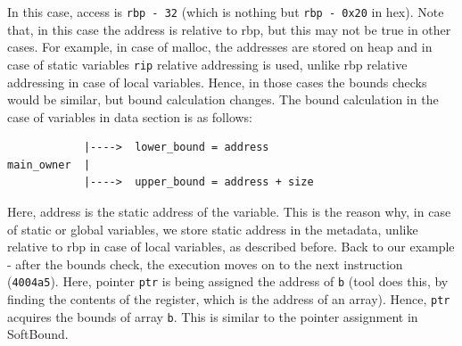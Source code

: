 In this case, access is \texttt{rbp - 32} (which is nothing but \texttt{rbp - 0x20} in hex). Note that, in this case the address is relative to rbp, but this may not be true in other cases. For example, in case of malloc, the addresses are stored on heap and in case of static variables \texttt{rip} relative addressing is used, unlike rbp relative addressing in case of local variables. Hence, in those cases the bounds checks would be similar, but bound calculation changes. The bound calculation in the case of variables in data section is as follows:
\begin{lstlisting}
            |---->  lower_bound = address
main_owner  |
            |---->  upper_bound = address + size
\end{lstlisting}
Here, address is the static address of the variable. This is the reason why, in case of static or global variables, we store static address in the metadata, unlike relative to rbp in case of local variables, as described before. Back to our example - after the bounds check, the execution moves on to the next instruction (\texttt{4004a5}). Here, pointer \texttt{ptr} is being assigned the address of \texttt{b} (tool does this, by finding the contents of the register, which is the address of an array). Hence, \texttt{ptr} acquires the bounds of array \texttt{b}. This is similar to the pointer assignment in SoftBound.

